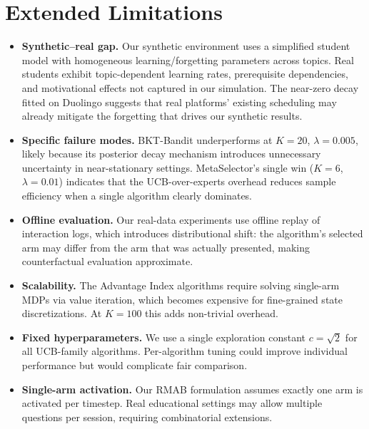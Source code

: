 \section{Extended Limitations}
\label{app:limitations}

\begin{itemize}[leftmargin=*,itemsep=2pt]
    \item \textbf{Synthetic--real gap.} Our synthetic environment uses a simplified student model with homogeneous learning/forgetting parameters across topics.
    Real students exhibit topic-dependent learning rates, prerequisite dependencies, and motivational effects not captured in our simulation.
    The near-zero decay fitted on Duolingo suggests that real platforms' existing scheduling may already mitigate the forgetting that drives our synthetic results.

    \item \textbf{Specific failure modes.} BKT-Bandit underperforms at $K{=}20$, $\lambda{=}0.005$, likely because its posterior decay mechanism introduces unnecessary uncertainty in near-stationary settings.
    MetaSelector's single win ($K{=}6$, $\lambda{=}0.01$) indicates that the UCB-over-experts overhead reduces sample efficiency when a single algorithm clearly dominates.

    \item \textbf{Offline evaluation.} Our real-data experiments use offline replay of interaction logs, which introduces distributional shift: the algorithm's selected arm may differ from the arm that was actually presented, making counterfactual evaluation approximate.

    \item \textbf{Scalability.} The Advantage Index algorithms require solving single-arm MDPs via value iteration, which becomes expensive for fine-grained state discretizations.
    At $K{=}100$ this adds non-trivial overhead.

    \item \textbf{Fixed hyperparameters.} We use a single exploration constant $c = \sqrt{2}$ for all UCB-family algorithms.
    Per-algorithm tuning could improve individual performance but would complicate fair comparison.

    \item \textbf{Single-arm activation.} Our RMAB formulation assumes exactly one arm is activated per timestep.
    Real educational settings may allow multiple questions per session, requiring combinatorial extensions.
\end{itemize}

